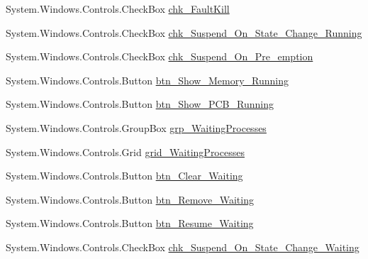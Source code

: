 \begin{DoxyCompactItemize}
\item 
System.\+Windows.\+Controls.\+Check\+Box \hyperlink{class_c_p_u___o_s___simulator_1_1_operating_system_main_window_ad8b3845bf83d04c87c660d142f021e83}{chk\+\_\+\+Fault\+Kill}
\item 
System.\+Windows.\+Controls.\+Check\+Box \hyperlink{class_c_p_u___o_s___simulator_1_1_operating_system_main_window_a9a1e7eb960838b74491342087f1fd4e8}{chk\+\_\+\+Suspend\+\_\+\+On\+\_\+\+State\+\_\+\+Change\+\_\+\+Running}
\item 
System.\+Windows.\+Controls.\+Check\+Box \hyperlink{class_c_p_u___o_s___simulator_1_1_operating_system_main_window_ae9f7c2437568b2f8eccbab46595b4669}{chk\+\_\+\+Suspend\+\_\+\+On\+\_\+\+Pre\+\_\+emption}
\item 
System.\+Windows.\+Controls.\+Button \hyperlink{class_c_p_u___o_s___simulator_1_1_operating_system_main_window_a4cad08518f7e5daad6942ae5ff90d3e5}{btn\+\_\+\+Show\+\_\+\+Memory\+\_\+\+Running}
\item 
System.\+Windows.\+Controls.\+Button \hyperlink{class_c_p_u___o_s___simulator_1_1_operating_system_main_window_aa96b6795f5dbf776f1ea985e18671f2e}{btn\+\_\+\+Show\+\_\+\+P\+C\+B\+\_\+\+Running}
\item 
System.\+Windows.\+Controls.\+Group\+Box \hyperlink{class_c_p_u___o_s___simulator_1_1_operating_system_main_window_ae3e3b5c1c34bc0caa4f44e02e5cbd81c}{grp\+\_\+\+Waiting\+Processes}
\item 
System.\+Windows.\+Controls.\+Grid \hyperlink{class_c_p_u___o_s___simulator_1_1_operating_system_main_window_afdd9d749d58fde066217f035ac2c46c4}{grid\+\_\+\+Waiting\+Processes}
\item 
System.\+Windows.\+Controls.\+Button \hyperlink{class_c_p_u___o_s___simulator_1_1_operating_system_main_window_abbbabd3ef96781478b77ea937e312eb1}{btn\+\_\+\+Clear\+\_\+\+Waiting}
\item 
System.\+Windows.\+Controls.\+Button \hyperlink{class_c_p_u___o_s___simulator_1_1_operating_system_main_window_a802d545b8ca3b04953277e409aef535f}{btn\+\_\+\+Remove\+\_\+\+Waiting}
\item 
System.\+Windows.\+Controls.\+Button \hyperlink{class_c_p_u___o_s___simulator_1_1_operating_system_main_window_a1f1064712f5d86ad7c818f1eabef4b05}{btn\+\_\+\+Resume\+\_\+\+Waiting}
\item 
System.\+Windows.\+Controls.\+Check\+Box \hyperlink{class_c_p_u___o_s___simulator_1_1_operating_system_main_window_ad8c47a378229241506f1d7540f40e6cd}{chk\+\_\+\+Suspend\+\_\+\+On\+\_\+\+State\+\_\+\+Change\+\_\+\+Waiting}

\end{DoxyCompactItemize}
